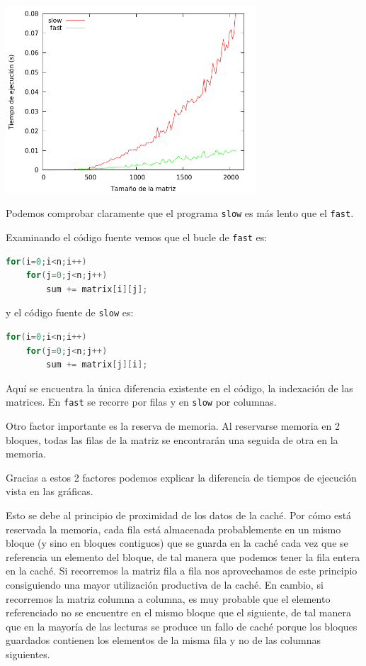 \documentclass[nochap]{apuntes}
\begin{document}
\begin{center}
\includegraphics[width=0.7\textwidth]{graficas/fotos/ejercicio1.png}
\end{center}

Podemos comprobar claramente que el programa \texttt{slow} es más lento que el \texttt{fast}.

Examinando el código fuente vemos que el bucle de \texttt{fast} es:

\begin{lstlisting}[language=c]
for(i=0;i<n;i++)
	for(j=0;j<n;j++)
		sum += matrix[i][j];
\end{lstlisting}
y el código fuente de \texttt{slow} es:

\begin{lstlisting}[language=c]
for(i=0;i<n;i++)
	for(j=0;j<n;j++)
		sum += matrix[j][i];
\end{lstlisting}

Aquí se encuentra la única diferencia existente en el código, la indexación de las matrices. En \texttt{fast} se recorre por filas y en \texttt{slow} por columnas.

Otro factor importante es la reserva de memoria. Al reservarse memoria en 2 bloques, todas las filas de la matriz se encontrarán una seguida de otra en la memoria.

Gracias a estos 2 factores podemos explicar la diferencia de tiempos de ejecución vista en las gráficas.

Esto se debe al principio de proximidad de los datos de la caché. Por cómo está reservada la memoria, cada fila está almacenada probablemente en un mismo bloque (y sino en bloques contiguos) que se guarda en la caché cada vez que se referencia un elemento del bloque, de tal manera que podemos tener la fila entera en la caché. Si recorremos la matriz fila a fila nos aprovechamos de este principio consiguiendo una mayor utilización productiva de la caché. En cambio, si recorremos la matriz columna a columna, es muy probable que el elemento referenciado no se encuentre en el mismo bloque que el siguiente, de tal manera que en la mayoría de las lecturas se produce un fallo de caché porque los bloques guardados contienen los elementos de la misma fila y no de las columnas siguientes.
\end{document}
